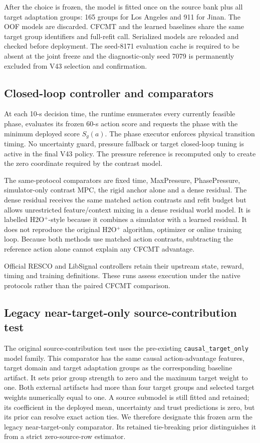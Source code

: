 After the choice is frozen, the model is fitted once on the source bank plus
all target adaptation groups: 165 groups for Los Angeles and 911 for Jinan.
The OOF models are discarded.  CFCMT and the learned baselines share the
same target group identifiers and full-refit call.  Serialized models are
reloaded and checked before deployment.  The seed-8171 evaluation cache is required
to be absent at the joint freeze and the diagnostic-only seed 7079 is
permanently excluded from V43 selection and confirmation.

\subsection{Closed-loop controller and comparators}

At each 10-s decision time, the runtime enumerates every currently feasible
phase, evaluates its frozen 60-s action score and requests the phase with the
minimum deployed score $S_g(a)$.  The phase executor enforces physical
transition timing.
No uncertainty guard, pressure fallback or target closed-loop tuning is active
in the final V43 policy.  The pressure reference is recomputed only to create
the zero coordinate required by the contrast model.

The same-protocol comparators are fixed time, MaxPressure, PhasePressure,
simulator-only contrast MPC, the rigid anchor alone and a dense residual.  The
dense residual receives the same matched action contrasts and refit budget
but allows unrestricted feature/context mixing in a dense residual world
model.  It is labelled H2O$^+$-style because it combines a simulator with a
learned residual.  It does not reproduce the original H2O$^+$ algorithm,
optimizer or online training loop.  Because both methods use matched action
contrasts, subtracting the reference action alone cannot explain any CFCMT
advantage.

Official RESCO and LibSignal controllers retain their upstream state, reward,
timing and training definitions.  These runs assess execution under the
native protocols rather than the paired CFCMT comparison.

\subsection{Legacy near-target-only source-contribution test}

The original source-contribution test uses the pre-existing
\texttt{causal\_target\_only} model family.  This comparator has the same causal
action-advantage features, target domain and target adaptation groups as the
corresponding baseline artifact.  It sets prior group strength to zero and the
maximum target weight to one.  Both external artifacts had more than four
target groups and selected target weights numerically equal to one.  A source
submodel is still fitted and retained; its coefficient in the deployed mean,
uncertainty and trust predictions is zero, but its prior can resolve exact
action ties.  We therefore designate this frozen arm the legacy near-target-only
comparator.  Its retained tie-breaking prior distinguishes it from a strict
zero-source-row estimator.

